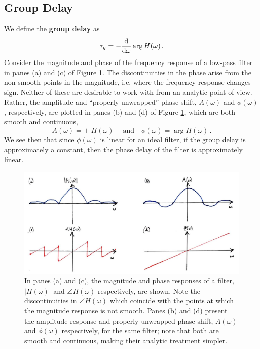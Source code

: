 \subsection{Group Delay}
%
We define the \textbf{group delay} as
%
\begin{displaymath}
  \tau_g = -\frac{\mathrm{d}}{\mathrm{d\omega}} \arg H(\omega) \,.
\end{displaymath}
%
Consider the magnitude and phase of the frequency response of a
low-pass filter in panes (a) and (c) of Figure
\ref{fig::lecture_16_amplitude_response}. The discontinuities in the phase 
arise from the non-smooth points in the magnitude, i.e. where the frequency
response changes sign. Neither of these are desirable to work with from
an analytic point of view. Rather, the amplitude and ``properly unwrapped''
phase-shift, $A(\omega)$ and $\phi(\omega)$, respectively, are plotted in
panes (b) and (d) of Figure \ref{fig::lecture_16_amplitude_response},
which are both smooth and continuous,
%
\begin{displaymath}
  A(\omega) = \pm |H(\omega)| \quad\mathrm{and}\quad
  \phi(\omega) = \arg H(\omega) \,.
\end{displaymath}
%
We see then that since $\phi(\omega)$ is linear for an ideal filter, if the
group delay is approximately a constant, then the phase delay of the filter
is approximately linear.
%
\begin{figure}[H]
  \includegraphics[width=\textwidth]{images/lecture_16_amplitude_response.JPG}
  \caption{In panes (a) and (c), the magnitude and phase responses of a filter,
    $|H(\omega)|$ and $\angle H(\omega)$ respectively, are shown. Note the
    discontinuities in $\angle H(\omega)$ which coincide with the points
    at which the magnitude response is not smooth. Panes (b) and (d) present
    the amplitude response and properly unwrapped phase-shift, $A(\omega)$ and
    $\phi(\omega)$ respectively, for the same filter; note that both are
    smooth and continuous, making their analytic treatment simpler.
  }
  \label{fig::lecture_16_amplitude_response}
\end{figure}

